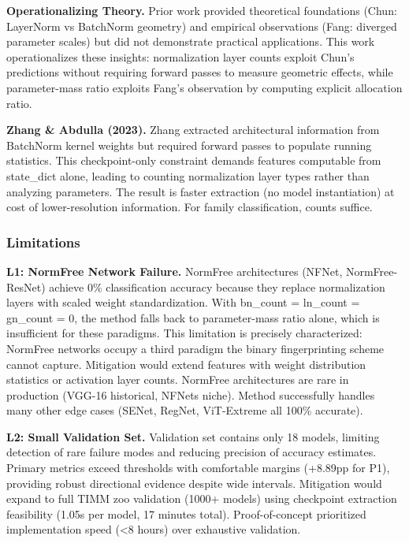 \textbf{Operationalizing Theory.} Prior work provided theoretical foundations (Chun: LayerNorm vs BatchNorm geometry) and empirical observations (Fang: diverged parameter scales) but did not demonstrate practical applications. This work operationalizes these insights: normalization layer counts exploit Chun's predictions without requiring forward passes to measure geometric effects, while parameter-mass ratio exploits Fang's observation by computing explicit allocation ratio.

\textbf{Zhang \& Abdulla (2023).} Zhang extracted architectural information from BatchNorm kernel weights but required forward passes to populate running statistics. This checkpoint-only constraint demands features computable from state\_dict alone, leading to counting normalization layer types rather than analyzing parameters. The result is faster extraction (no model instantiation) at cost of lower-resolution information. For family classification, counts suffice.

\subsubsection{Limitations}

\textbf{L1: NormFree Network Failure.} NormFree architectures (NFNet, NormFree-ResNet) achieve 0\% classification accuracy because they replace normalization layers with scaled weight standardization. With bn\_count = ln\_count = gn\_count = 0, the method falls back to parameter-mass ratio alone, which is insufficient for these paradigms. This limitation is precisely characterized: NormFree networks occupy a third paradigm the binary fingerprinting scheme cannot capture. Mitigation would extend features with weight distribution statistics or activation layer counts. NormFree architectures are rare in production (VGG-16 historical, NFNets niche). Method successfully handles many other edge cases (SENet, RegNet, ViT-Extreme all 100\% accurate).

\textbf{L2: Small Validation Set.} Validation set contains only 18 models, limiting detection of rare failure modes and reducing precision of accuracy estimates. Primary metrics exceed thresholds with comfortable margins (+8.89pp for P1), providing robust directional evidence despite wide intervals. Mitigation would expand to full TIMM zoo validation (1000+ models) using checkpoint extraction feasibility (1.05s per model, 17 minutes total). Proof-of-concept prioritized implementation speed (<8 hours) over exhaustive validation.

